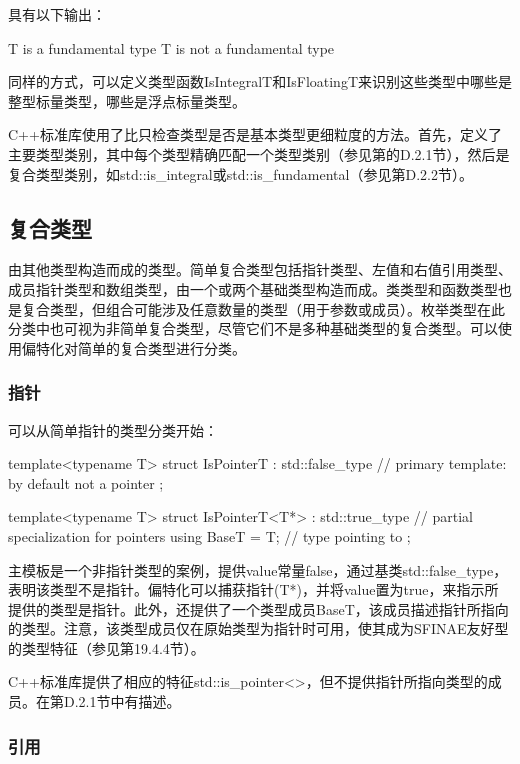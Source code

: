 具有以下输出：

\begin{shell}
T is a fundamental type
T is not a fundamental type
\end{shell}

同样的方式，可以定义类型函数IsIntegralT和IsFloatingT来识别这些类型中哪些是整型标量类型，哪些是浮点标量类型。

C++标准库使用了比只检查类型是否是基本类型更细粒度的方法。首先，定义了主要类型类别，其中每个类型精确匹配一个类型类别（参见第的D.2.1节），然后是复合类型类别，如std::is\_integral或std::is\_fundamental（参见第D.2.2节）。

\subsection{复合类型}

由其他类型构造而成的类型。简单复合类型包括指针类型、左值和右值引用类型、成员指针类型和数组类型，由一个或两个基础类型构造而成。类类型和函数类型也是复合类型，但组合可能涉及任意数量的类型（用于参数或成员）。枚举类型在此分类中也可视为非简单复合类型，尽管它们不是多种基础类型的复合类型。可以使用偏特化对简单的复合类型进行分类。

\subsubsection{指针}

可以从简单指针的类型分类开始：

\begin{cpp}
template<typename T>
struct IsPointerT : std::false_type { // primary template: by default not a pointer
};

template<typename T>
struct IsPointerT<T*> : std::true_type { // partial specialization for pointers
	using BaseT = T; // type pointing to
};
\end{cpp}

主模板是一个非指针类型的案例，提供value常量false，通过基类std::false\_type，表明该类型不是指针。偏特化可以捕获指针(T*)，并将value置为true，来指示所提供的类型是指针。此外，还提供了一个类型成员BaseT，该成员描述指针所指向的类型。注意，该类型成员仅在原始类型为指针时可用，使其成为SFINAE友好型的类型特征（参见第19.4.4节）。

C++标准库提供了相应的特征std::is\_pointer<>，但不提供指针所指向类型的成员。在第D.2.1节中有描述。

\subsubsection{引用}

